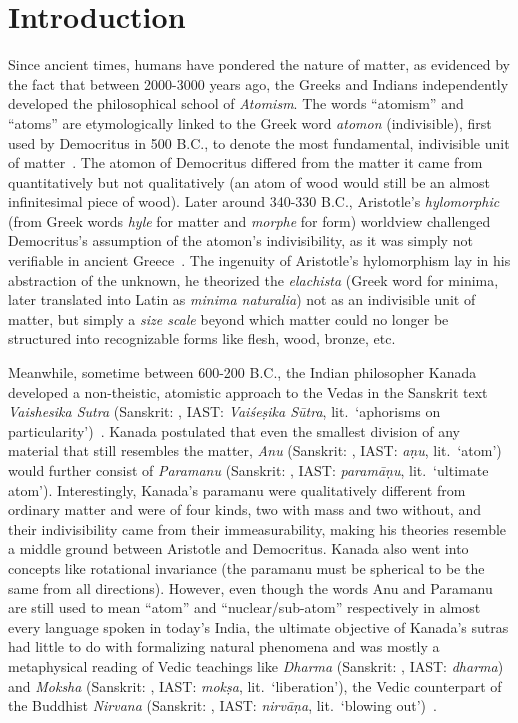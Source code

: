 \chapter{Introduction}
\label{ch:intro}
Since ancient times, humans have pondered the nature of matter, as evidenced by the fact that between 2000-3000 years ago, the Greeks and Indians independently developed the philosophical school of \emph{Atomism}. 
%
The words ``atomism'' and  ``atoms'' are etymologically linked to the Greek word \emph{atomon} (indivisible), first used by Democritus in 500 B.C., to denote the most fundamental, indivisible unit of matter~\cite{taylor1999atomists}. 
%
The atomon of Democritus differed from the matter it came from quantitatively but not qualitatively (an atom of wood would still be an almost infinitesimal piece of wood). 
%
Later around 340-330 B.C., Aristotle's \emph{hylomorphic} (from Greek words \emph{hyle} for matter and \emph{morphe} for form) worldview challenged Democritus's assumption of the atomon's indivisibility, as it was simply not verifiable in ancient Greece~\cite{Lloyd1970EarlyGreekScience}. 
%
The ingenuity of Aristotle's hylomorphism lay in his abstraction of the unknown, he theorized the \emph{elachista} (Greek word for minima, later translated into Latin as \emph{minima naturalia})  not as an indivisible unit of matter,  but simply a \emph{size scale} beyond which matter could no longer be structured into recognizable forms like flesh, wood, bronze, etc.


Meanwhile, sometime between 600-200 B.C., the Indian philosopher Kanada developed a non-theistic, atomistic approach to the Vedas in the Sanskrit text \emph{Vaishesika Sutra} (Sanskrit: , IAST: \emph{Vai\'se\d{s}ika S\=utra}, lit.\ `aphorisms on particularity')~\cite{chakrabarty2003vaisesika}.
%
Kanada postulated that even the smallest division of any material that still resembles the matter, \emph{Anu} (Sanskrit: , IAST: \emph{a\d{n}u}, lit.\ `atom') would further consist of \emph{Paramanu} (Sanskrit: , IAST: \emph{param\=a\d{n}u}, lit.\ `ultimate atom').
%
Interestingly, Kanada's paramanu were qualitatively different from ordinary matter and were of four kinds, two with mass and two without, and their indivisibility came from their immeasurability, making his theories resemble a middle ground between Aristotle and Democritus.
%
Kanada also went into concepts like rotational invariance (the paramanu must be spherical to be the same from all directions).
%
However, even though the words Anu and Paramanu are still used to mean ``atom'' and ``nuclear/sub-atom'' respectively in almost every language spoken in today's India, the ultimate objective of Kanada's sutras had little to do with formalizing natural phenomena and was mostly a metaphysical reading of Vedic teachings like \emph{Dharma} (Sanskrit: , IAST: \emph{dharma}) and \emph{Moksha} (Sanskrit: , IAST: \emph{mok\d{s}a}, lit.\ `liberation'), the Vedic counterpart of the Buddhist \emph{Nirvana} (Sanskrit: , IAST: \emph{nirv\=a\d{n}a}, lit.\ `blowing out')~\cite{klostermaier2010survey}.  
%

